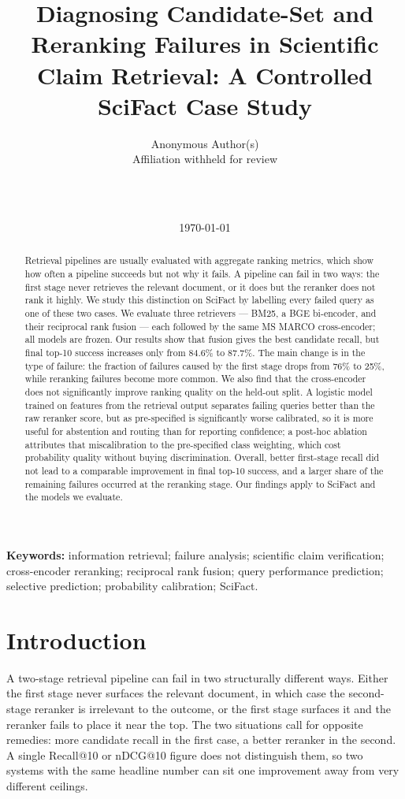 \documentclass[11pt,a4paper]{article}
\title{\bfseries Diagnosing Candidate-Set and Reranking Failures in Scientific Claim
Retrieval: A Controlled SciFact Case Study}
\author{Anonymous Author(s)\\ \small Affiliation withheld for review}
\author{%
    \authorname\\
    \small \authoraffiliation\\
    \small \href{mailto:\authoremail}{\texttt{\authoremail}}%
  }
\date{\today}
\begin{document}
\maketitle

\begin{abstract}
\noindent
Retrieval pipelines are usually evaluated with aggregate ranking metrics, which show how often a
pipeline succeeds but not why it fails. A pipeline can fail in two ways: the first stage never
retrieves the relevant document, or it does but the reranker does not rank it highly. We study
this distinction on SciFact by labelling every failed query as one of these two cases. We
evaluate three retrievers --- BM25, a BGE bi-encoder, and their reciprocal rank fusion --- each
followed by the same MS MARCO cross-encoder; all models are frozen. Our results show that fusion gives the
best candidate recall, but final top-10 success increases only from 84.6\% to 87.7\%. The main
change is in the type of failure: the fraction of failures caused by the first stage drops from
76\% to 25\%, while reranking failures become more common. We also find that the cross-encoder
does not significantly improve ranking quality on the held-out split. A logistic model trained on
features from the retrieval output separates failing queries better than the raw reranker score,
but as pre-specified is significantly worse calibrated, so it is more useful for abstention and
routing than for reporting confidence; a post-hoc ablation attributes that miscalibration to the
pre-specified class weighting, which cost probability quality without buying discrimination. Overall, better first-stage recall did not lead to a comparable improvement
in final top-10 success, and a larger share of the remaining failures occurred at the reranking
stage. Our findings apply to SciFact and the models we evaluate.
\end{abstract}

\noindent\textbf{Keywords:} information retrieval; failure analysis; scientific claim
verification; cross-encoder reranking; reciprocal rank fusion; query performance prediction;
selective prediction; probability calibration; SciFact.

\section{Introduction}

A two-stage retrieval pipeline can fail in two structurally different ways. Either the first
stage never surfaces the relevant document, in which case the second-stage reranker is
irrelevant to the outcome, or the first stage surfaces it and the reranker fails to place it
near the top. The two situations call for opposite remedies: more candidate recall in the first
case, a better reranker in the second. A single Recall@10 or nDCG@10 figure does not distinguish
them, so two systems with the same headline number can sit one improvement away from very
different ceilings.
\end{document}
